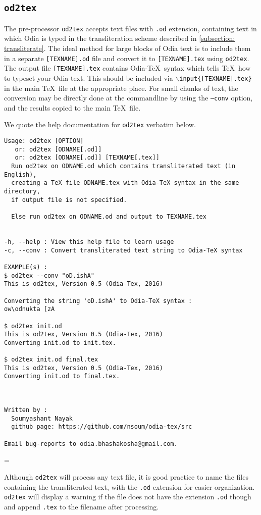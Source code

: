 \documentclass[12pt]{article}
\def\odtex{Odia-\TeX}
\newenvironment{warning}
  {\par\begin{mdframed}[linewidth=2pt,linecolor=red]%
    \begin{list}{}{\leftmargin=1cm
                   \labelwidth=\leftmargin}\item[\Large\ding{43}]}
  {\end{list}\end{mdframed}\par}
\begin{document}
\subsection{\tt od2tex}
\label{subsection: od2tex}
The pre-processor {\tt od2tex} accepts text files with {\tt .od} extension, containing text in which Odia is typed
in the transliteration scheme described in \ref{subsection: transliterate}. The ideal method for large blocks of Odia text
is to include them in a separate {\tt [TEXNAME].od} file and convert it to {\tt [TEXNAME].tex} using {\tt od2tex}.
The output file {\tt [TEXNAME].tex} contains \odtex\ syntax which tells \TeX\ how to typeset your Odia text. This should be included
via {\tt $\backslash$input\{[TEXNAME].tex\}} in the main \TeX\ file at the appropriate place. For small chunks of text, the conversion 
may be directly done at the commandline by using the {\tt --conv} option, and the results copied to the main \TeX\ file.

We quote the help documentation for {\tt od2tex} verbatim below.
\begin{verbatim}
Usage: od2tex [OPTION]
   or: od2tex [ODNAME[.od]]
   or: od2tex [ODNAME[.od]] [TEXNAME[.tex]]
  Run od2tex on ODNAME.od which contains transliterated text (in English), 
  creating a TeX file ODNAME.tex with Odia-TeX syntax in the same directory,
  if output file is not specified.

  Else run od2tex on ODNAME.od and output to TEXNAME.tex
  
  
-h, --help : View this help file to learn usage
-c, --conv : Convert transliterated text string to Odia-TeX syntax

EXAMPLE(s) :
$ od2tex --conv "oD.ishA"
This is od2tex, Version 0.5 (Odia-Tex, 2016)

Converting the string 'oD.ishA' to Odia-TeX syntax : 
ow\odnukta [zA

$ od2tex init.od
This is od2tex, Version 0.5 (Odia-Tex, 2016)
Converting init.od to init.tex.

$ od2tex init.od final.tex
This is od2tex, Version 0.5 (Odia-Tex, 2016)
Converting init.od to final.tex. 



Written by :
  Soumyashant Nayak
  github page: https://github.com/nsoum/odia-tex/src

Email bug-reports to odia.bhashakosha@gmail.com.
\end{verbatim}

\begin{warning}
Although {\tt od2tex} will process any text file, it is good practice to name the files containing the transliterated text, with the {\tt .od} extension for easier
organization. {\tt od2tex}  will display a warning if the file does not have the extension {\tt .od} though and append {\tt .tex} to the filename after processing.
\end{warning}
\end{document}
